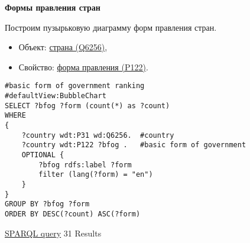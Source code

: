 \textbf{Формы правления стран}

Построим пузырьковую диаграмму форм правления стран.

\begin{itemize}
    \item Объект: \href{https://www.wikidata.org/wiki/Q6256}{страна (Q6256)},
    \item Свойство: \href{https://www.wikidata.org/wiki/Property:P122}{форма правления (P122)}.
\end{itemize}

\begin{lstlisting}[language=SPARQL]
#basic form of government ranking
#defaultView:BubbleChart
SELECT ?bfog ?form (count(*) as ?count)
WHERE 
{
    ?country wdt:P31 wd:Q6256.  #country
    ?country wdt:P122 ?bfog .   #basic form of government
    OPTIONAL {
		?bfog rdfs:label ?form
		filter (lang(?form) = "en")
	}
}
GROUP BY ?bfog ?form
ORDER BY DESC(?count) ASC(?form)
\end{lstlisting}

\href{https://query.wikidata.org/#%23basic%20form%20of%20government%20ranking%0A%23defaultView%3ABubbleChart%0ASELECT%20%3Fbfog%20%3Fform%20%28count%28%2a%29%20as%20%3Fcount%29%0AWHERE%20%0A%7B%0A%20%20%20%20%3Fcountry%20wdt%3AP31%20wd%3AQ6256.%0A%20%20%20%20%3Fcountry%20wdt%3AP122%20%3Fbfog%20.%0A%20%20%20%20OPTIONAL%20%7B%0A%09%09%3Fbfog%20rdfs%3Alabel%20%3Fform%0A%09%09filter%20%28lang%28%3Fform%29%20%3D%20%22en%22%29%0A%09%7D%0A%7D%0AGROUP%20BY%20%3Fbfog%20%3Fform%0AORDER%20BY%20DESC%28%3Fcount%29%20ASC%28%3Fform%29%0A}{SPARQL query} 31 Results


